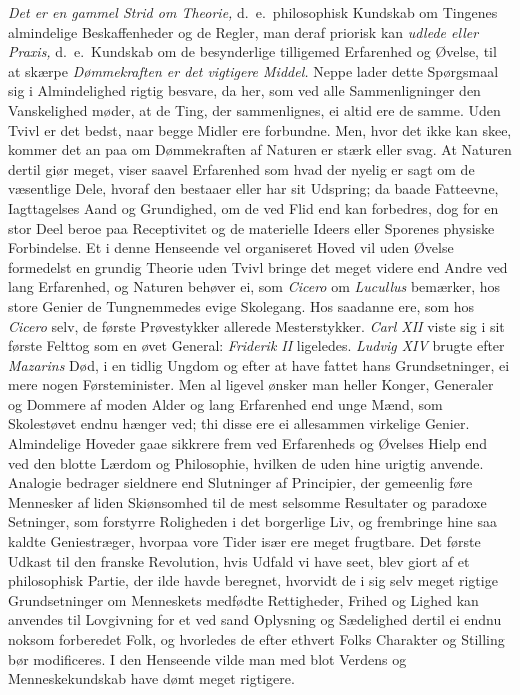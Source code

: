 \documentclass[12pt,a4paper]{article}
\newcommand{\opage}[1]{\marginnote{\footnotesize\textit{[#1]}}}
\begin{document}
\emph{Det er en gammel Strid om Theorie,} d.~e.\ philosophisk Kundskab om Tingenes
almindelige Beskaffenheder og de Regler, man deraf priorisk kan
\opage{165} \emph{udlede eller Praxis,} d.~e.\ Kundskab om de besynderlige tilligemed Erfarenhed og
Øvelse, til at skærpe \emph{Dømmekraften er det vigtigere Middel.} Neppe lader dette
Spørgsmaal sig i Almindelighed rigtig besvare, da her, som ved alle Sammenligninger den
Vanskelighed møder, at de Ting, der sammenlignes, ei altid ere de samme. Uden Tvivl er det
bedst, naar begge Midler ere forbundne. Men, hvor det ikke kan skee, kommer det an paa om
Dømmekraften af Naturen er stærk eller svag. At Naturen dertil giør meget, viser saavel
Erfarenhed som hvad der nyelig er sagt om de væsentlige Dele, hvoraf den bestaaer eller
har sit Udspring; da baade Fatteevne, Iagttagelses Aand og Grundighed, om de ved Flid end
kan forbedres, dog for en stor Deel beroe paa Receptivitet og de materielle Ideers eller
Sporenes physiske Forbindelse. Et i denne Henseende vel organiseret Hoved vil uden Øvelse
formedelst en grundig Theorie uden Tvivl bringe det meget videre end Andre ved lang
Erfarenhed, og Naturen behøver ei, som \emph{Cicero} om \emph{Lucullus} bemærker, hos
store Genier de Tungnemmedes evige Skolegang. Hos saadanne ere, som hos \emph{Cicero}
selv, de første Prøvestykker allerede Mesterstykker. \emph{Carl XII} viste sig i sit
første Felttog som en øvet General: \emph{Friderik II} ligeledes. \emph{Ludvig XIV} brugte
efter \emph{Mazarins} Død, i en tidlig Ungdom og efter at have fattet hans Grundsetninger,
ei mere nogen Førsteminister. Men al%
\opage{166}ligevel ønsker man heller Konger, Generaler og Dommere af moden Alder og lang Erfarenhed
end unge Mænd, som Skolestøvet endnu hænger ved; thi disse ere ei allesammen virkelige
Genier. Almindelige Hoveder gaae sikkrere frem ved Erfarenheds og Øvelses Hielp end ved
den blotte Lærdom og Philosophie, hvilken de uden hine urigtig anvende. Analogie bedrager
sieldnere end Slutninger af Principier, der gemeenlig føre Mennesker af liden Skiønsomhed
til de mest selsomme Resultater og paradoxe Setninger, som forstyrre Roligheden i det
borgerlige Liv, og frembringe hine saa kaldte Geniestræger, hvorpaa vore Tider især ere
meget frugtbare. Det første Udkast til den franske Revolution, hvis Udfald vi have seet,
blev giort af et philosophisk Partie, der ilde havde beregnet, hvorvidt de i sig selv
meget rigtige Grundsetninger om Menneskets medfødte Rettigheder, Frihed og Lighed kan
anvendes til Lovgivning for et ved sand Oplysning og Sædelighed dertil ei endnu noksom
forberedet Folk, og hvorledes de efter ethvert Folks Charakter og Stilling bør modificeres.
I den Henseende vilde man med blot Verdens og Menneskekundskab have dømt meget rigtigere.
\end{document}
